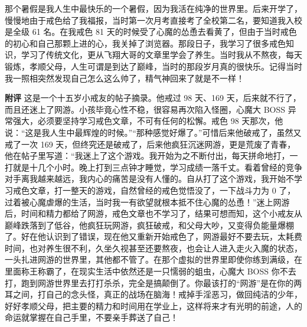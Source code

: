 \begin{case}
    那个暑假是我人生中最快乐的一个暑假，因为我活在纯净的世界里。后来开学了，慢慢地由于戒色给了我福报，当时第一次月考直接考了全校第二名，要知道我入校是全级 61 名。在我戒色 81 天的时候受了心魔的怂恿去看黄了，但由于当时戒色的初心和自己那颗上进的心，我关掉了浏览器。那段日子，我学习了很多戒色知识，学习了传统文化，更从飞翔大哥的文章里学会了养生。当时我从不熬夜，每天锻炼，孝顺父母，人生可谓是到达了巅峰，当时的那段岁月真的很快乐。记得当时我一照相突然发现自己怎么这么帅了，精气神回来了就是不一样！

    \textbf{附评} 这是一个十五岁小戒友的帖子摘录。他戒过 98 天、169 天，后来就不行了，而且还迷上了网游。小孩毕竟心性不稳，很容易再次陷入怪圈，心魔大 BOSS 异常强大，必须要坚持学习戒色文章，不可有任何的松懈。戒色 98 天那次，他说：“这是我人生中最辉煌的时候。”“那种感觉好爆了。”可惜后来他破戒了，虽然又戒了一次 169 天，但终究还是破戒了，后来他疯狂沉迷网游，更是荒废了青春，他在帖子里写道：“我迷上了这个游戏。我开始为之不断付出，每天拼命地打，一打就是十几个小时。晚上打到三点钟才睡觉，学习成绩一落千丈。看着曾经的竞争对手离我越来越远，我内心的痛苦是没有人懂的。自从打了这个游戏，我开始不学习戒色文章，打一整天的游戏，自然曾经的戒色觉悟没了，一下战斗力为 0 了，过着被心魔虐爆的生活，当时我一有欲望就根本抵不住心魔的怂恿！”迷上网游后，时间和精力都给了网游，戒色文章也不学习了，结果可想而知，这个小戒友从巅峰跌落到了低谷，他疯狂玩网游，疯狂破戒，和父母大吵，又变得负能量爆棚了。好在他认识到了错误，现在他又重新开始戒色了，网游最好不要去玩，太耗费时间，也对养生很不利，久坐久视甚至还要熬夜，也会让人进入走火入魔的状态，一头扎进网游的世界里，其他都不管了。在那个虚拟的世界里即使你练到满级，在里面称王称霸了，在现实生活中依然还是一只懦弱的蛆虫，心魔大 BOSS 你不去打，跑到网游世界里去打打杀杀，完全是搞颠倒了。你最该打的“网游”是在你的两耳之间，打自己的念头怪，真正的战场在脑海！戒掉手淫恶习，做回纯洁的少年，好好孝顺父母，把主要的精力和时间用在学业上，这样将来才有光明的前途，人的命运就掌握在自己手里，不要亲手葬送了自己！
\end{case}

